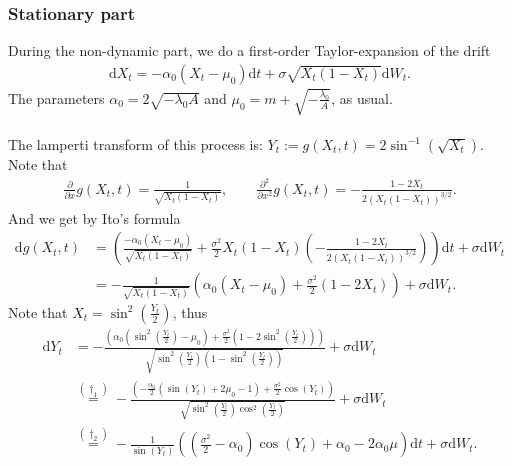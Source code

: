 \subsubsection{Stationary part}
During the non-dynamic part, we do a first-order Taylor-expansion of the drift
\begin{align}
    \mathrm{d}X_t = -\alpha_0\left(X_t - \mu_0\right)\mathrm{d}t + \sigma \sqrt{X_t\left(1 - X_t\right)}\mathrm{d}W_t.
\end{align}
The parameters $\alpha_0 = 2\sqrt{-\lambda_0 A}$ and $\mu_0 = m + \sqrt{-\frac{\lambda_0}{A}}$, as usual.\\\\
The lamperti transform of this process is: $Y_t := g(X_t,t) = 2 \sin^{-1}\left(\sqrt{X_t}\right)$.
Note that
\begin{align}
    \frac{\partial}{\partial x}g(X_t,t) = \frac{1}{\sqrt{X_t\left(1 - X_t\right)}}, \qquad \frac{\partial^2}{\partial x^2}g(X_t,t) = -\frac{1 - 2X_t}{2\left(X_t\left(1 - X_t\right)\right)^{3/2}}.
\end{align}
And we get by Ito's formula
\begin{align}
    \mathrm{d}g(X_t, t) &= \left(\frac{-\alpha_0\left(X_t - \mu_0\right)}{\sqrt{X_t\left(1 - X_t\right)}} + \frac{\sigma^2}{2}X_t\left(1 - X_t\right)\left(-\frac{1 - 2X_t}{2\left(X_t\left(1 - X_t\right)\right)^{3/2}}\right)\right)\mathrm{d}t + \sigma\mathrm{d}W_t \nonumber \\
    &= -\frac{1}{\sqrt{X_t\left(1 - X_t\right)}}\left(\alpha_0\left(X_t - \mu_0\right) + \frac{\sigma^2}{2}\left(1 - 2X_t\right)\right) + \sigma\mathrm{d}W_t.
\end{align}
Note that $X_t = \sin^2\left(\frac{Y_t}{2}\right)$, thus
\begin{align}
    \mathrm{d}Y_t & = -\frac{\left(\alpha_0\left(\sin^2\left(\frac{Y_t}{2}\right) - \mu_0\right) + \frac{\sigma^2}{2}\left(1 - 2\sin^2\left(\frac{Y_t}{2}\right)\right)\right)}{\sqrt{\sin^2\left(\frac{Y_t}{2}\right)\left(1 - \sin^2\left(\frac{Y_t}{2}\right)\right)}} + \sigma\mathrm{d}W_t \nonumber \\
    & \overset{(\dagger_1)}{=} -\frac{\left(-\frac{\alpha_0}{2}\left(\sin\left(Y_t\right) + 2\mu_0 - 1\right) + \frac{\sigma^2}{2}\cos(Y_t)\right)}{\sqrt{\sin^2\left(\frac{Y_t}{2}\right)\cos^2\left(\frac{Y_t}{2}\right)}} + \sigma\mathrm{d}W_t \nonumber \\
    & \overset{(\dagger_2)}{=} -\frac{1}{\sin\left(Y_t\right)}\left(\left(\frac{\sigma^2}{2}-\alpha_0\right)\cos(Y_t) + \alpha_0 - 2\alpha_0\mu\right)\mathrm{d}t + \sigma \mathrm{d}W_t. \label{eq:JacobiLampertiSDE}
\end{align}
